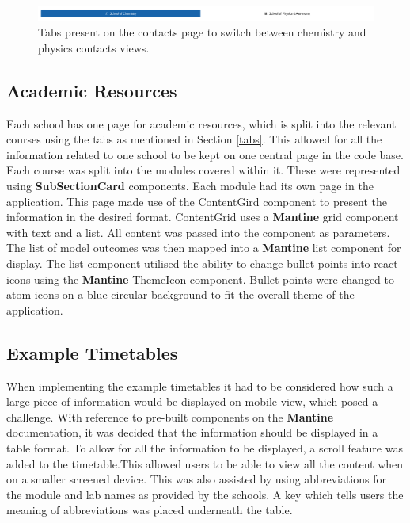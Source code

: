 \documentclass{l4proj}
\begin{document}
\begin{figure}[ht]
    \centering
    \includegraphics[width=\linewidth]{images/tabs.pdf}    
    \caption{Tabs present on the contacts page to switch between chemistry and physics contacts views.}
    \label{fig:tabs} 
\end{figure}

\subsection{Academic Resources}
Each school has one page for academic resources,  which is split into the relevant courses using the tabs as mentioned in Section \ref{tabs}. This allowed for all the information related to one school to be kept on one central page in the code base. Each course was split into the modules covered within it. These were represented using \textbf{SubSectionCard} components. Each module had its own page in the application. This page made use of the ContentGird component to present the information in the desired format. ContentGrid uses a \textbf{Mantine} grid component with text and a list. All content was passed into the component as parameters. The list of model outcomes was then mapped into a \textbf{Mantine} list component for display. The list component utilised the ability to change bullet points into react-icons using the \textbf{Mantine} ThemeIcon component. Bullet points were changed to atom icons on a blue circular background to fit the overall theme of the application.

\subsection{Example Timetables} \label{timetable}
When implementing the example timetables it had to be considered how such a large piece of information would be displayed on mobile view,  which posed a challenge. With reference to pre-built components on the \textbf{Mantine} documentation,  it was decided that the information should be displayed in a table format. To allow for all the information to be displayed,  a scroll feature was added to the timetable.This allowed users to be able to view all the content when on a smaller screened device. This was also assisted by using abbreviations for the module and lab names as provided by the schools. A key which tells users the meaning of abbreviations was placed underneath the table.
\end{document}

